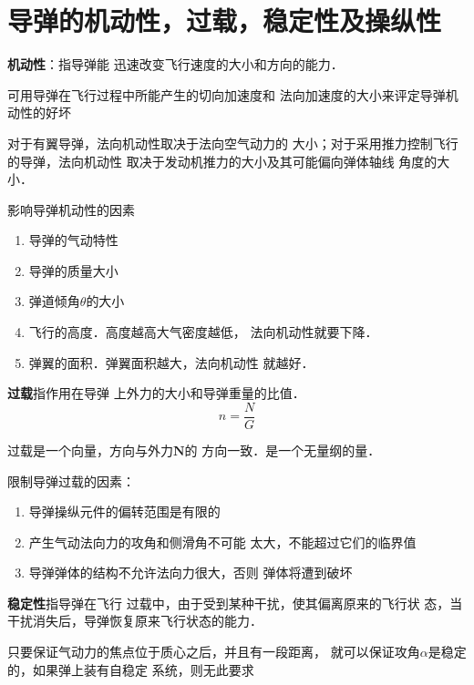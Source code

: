 \section{导弹的机动性，过载，稳定性及操纵性}
{\bfseries 机动性}：指导弹能
迅速改变飞行速度的大小和方向的能力．
\begin{note}
可用导弹在飞行过程中所能产生的切向加速度和
法向加速度的大小来评定导弹机动性的好坏
\end{note}

对于有翼导弹，法向机动性取决于法向空气动力的
大小；对于采用推力控制飞行的导弹，法向机动性
取决于发动机推力的大小及其可能偏向弹体轴线
角度的大小．

\begin{notice}
影响导弹机动性的因素
\begin{enumerate}
  \item 导弹的气动特性
  \item 导弹的质量大小
  \item 弹道倾角$\theta$的大小
  \item 飞行的高度．高度越高大气密度越低，
    法向机动性就要下降．
  \item 弹翼的面积．弹翼面积越大，法向机动性
    就越好．
\end{enumerate}
\end{notice}

{\bfseries 过载}指作用在导弹
上外力的大小和导弹重量的比值．
\[
  n=\frac{N}{G }
\]
\begin{note}
过载是一个向量，方向与外力$\mathbf{N}$的
方向一致．是一个无量纲的量．
\end{note}
\begin{notice}
限制导弹过载的因素：
\begin{enumerate}
  \item 导弹操纵元件的偏转范围是有限的
  \item 产生气动法向力的攻角和侧滑角不可能
    太大，不能超过它们的临界值
  \item 导弹弹体的结构不允许法向力很大，否则
    弹体将遭到破坏
\end{enumerate}
\end{notice}

{\bfseries 稳定性}指导弹在飞行
过载中，由于受到某种干扰，使其偏离原来的飞行状
态，当干扰消失后，导弹恢复原来飞行状态的能力．
\begin{note}
只要保证气动力的焦点位于质心之后，并且有一段距离，
就可以保证攻角$\alpha$是稳定的，如果弹上装有自稳定
系统，则无此要求
\end{note}

